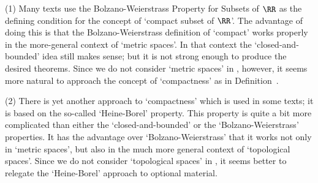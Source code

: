 {        \hspace*{\parindent}(1) Many texts use the Bolzano-Weierstrass Property for Subsets of ${\RR}$ as the defining condition for the concept of `compact subset of ${\RR}$'.
    The advantage of doing this is that the Bolzano-Weierstrass definition of `compact' works properly in the more-general context of `metric spaces'.
    In that context the `closed-and-bounded' idea still makes sense; but it is not strong enough to produce the desired theorems.
    Since we do not consider `metric spaces' in {\ThisText}, however, it seems more natural to approach the concept of `compactness' as in Definition~.

\V

        (2) There is yet another approach to `compactness'  which is used in some texts; it is based on the so-called `Heine-Borel' property.
    This property is quite a bit more complicated than either the `closed-and-bounded' or the `Bolzano-Weierstrass' properties.
    It has the advantage over `Bolzano-Weierstrass' that it works not only in `metric spaces', but also in the much more general context of `topological spaces'.
    Since we do not consider `topological spaces' in {\ThisText}, it seems better to relegate the `Heine-Borel' approach to optional material.

}%
\V

